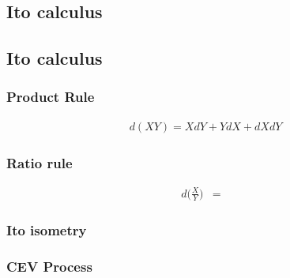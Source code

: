 \subsection{Ito calculus}

\subsection{Ito calculus}

\subsubsection{Product Rule}

\begin{eqnarray}
d(XY) = XdY + YdX +dX dY
\end{eqnarray}

\subsubsection{Ratio rule}
\begin{eqnarray}
d\bigg(\frac{X}{Y}\bigg) &=& 
\end{eqnarray}

\subsubsection{Ito isometry}

\subsubsection{CEV Process}